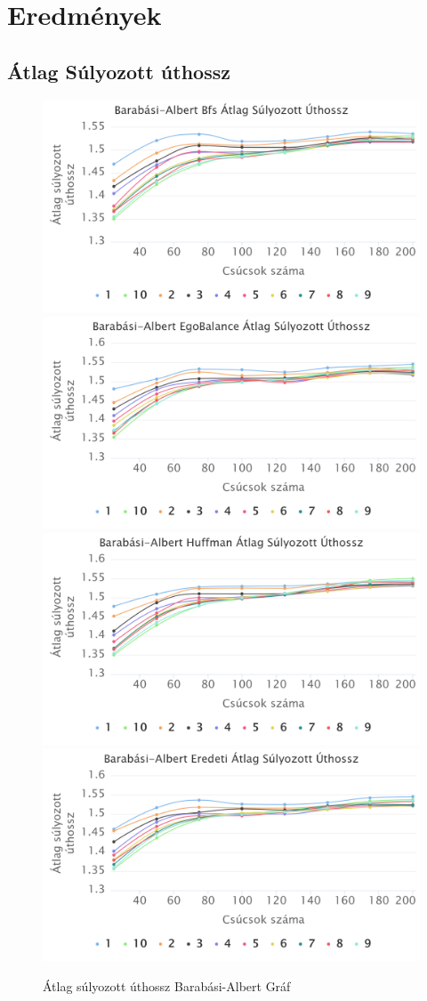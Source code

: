 \documentclass[12pt]{report}
\begin{document}
\section{Eredmények}

\subsection{Átlag Súlyozott úthossz}


\begin{figure}[h]
	\begin{center}
		\includegraphics[width=0.49\linewidth]{pictures/barabasi_avg_len_bfs.png}
		\includegraphics[width=0.49\linewidth]{pictures/barabasi_avg_len_egobalance.png}
		\includegraphics[width=0.49\linewidth]{pictures/barabasi_avg_len_huffman.png}
		\includegraphics[width=0.49\linewidth]{pictures/barabasi_avg_len_original.png}
		\caption{Átlag súlyozott úthossz Barabási-Albert Gráf}
	\end{center}
\end{figure}
\end{document}

